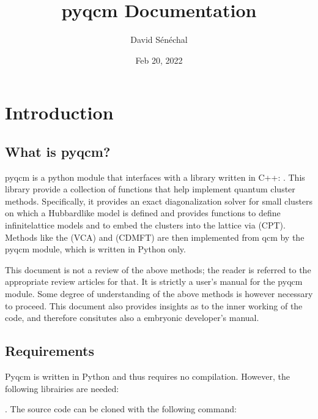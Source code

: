 \documentclass[letterpaper,10pt,english]{sphinxmanual}
\title{pyqcm Documentation}
\date{Feb 20, 2022}
\author{David Sénéchal}
\begin{document}
\pagestyle{empty}
\sphinxmaketitle
\pagestyle{plain}
\sphinxtableofcontents
\pagestyle{normal}
\label{\detokenize{index::doc}}



\chapter{Introduction}
\label{\detokenize{intro:introduction}}\label{\detokenize{intro::doc}}

\section{What is pyqcm?}
\label{\detokenize{intro:what-is-pyqcm}}
\sphinxAtStartPar
pyqcm is a python module that interfaces with a library written in C++: .
This library provide a collection of functions that help implement quantum cluster methods.
Specifically, it provides an exact diagonalization solver for small clusters on which a Hubbard\sphinxhyphen{}like model is defined and provides functions to define infinite\sphinxhyphen{}lattice models and to embed the clusters into the lattice via  (CPT). Methods like the  (VCA) and  (CDMFT) are then implemented from qcm by the pyqcm module, which is written in Python only.

\sphinxAtStartPar
This document is not a review of the above methods; the reader is referred to the appropriate review articles for that. It is strictly a user’s manual for the pyqcm module.
Some degree of understanding of the above methods is however necessary to proceed.
This document also provides insights as to the inner working of the code, and therefore consitutes also a embryonic developer’s manual.


\section{Requirements}
\label{\detokenize{intro:requirements}}
\sphinxAtStartPar
Pyqcm is written in Python and thus requires no compilation.
However, the following librairies are needed:

\sphinxAtStartPar
{}. The source code can be cloned with the following command:

\begin{sphinxVerbatim}[commandchars=\\\{\}]
  
\end{sphinxVerbatim}
\end{document}
